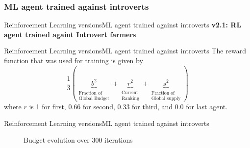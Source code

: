 \documentclass[10pt, aspectratio=169]{beamer}
\def\ab{Reinforcement Learning versions}
\def\abc{ML agent trained against introverts}
\begin{document}
\subsubsection{\abc}

\begin{frame}{\ab}{\abc}
  \centering
  \textbf{v2.1: RL agent trained againt Introvert farmers}
\end{frame}

\begin{frame}{\ab}{\abc}
  The reward function that was used for training is given by
\begin{equation}
    \frac{1}{3}(\underbrace{b^2}_{\substack{\text{Fraction of}\\\text{Global Budget}}} + \underbrace{r^2}_{\substack{\text{Current}\\\text{Ranking}}} + \underbrace{s^2}_{\substack{\text{Fraction of}\\\text{Global supply}}})
\end{equation}
where $r$ is 1 for first, $0.66$ for second, $0.33$ for third, and
$0.0$ for last agent.
\end{frame}


\begin{frame}{\ab}{\abc}
\begin{figure}[H]
    \centering
    \caption{Budget evolution over 300 iterations}
    \label{fig:budget MLvsIntros}
\end{figure}
\end{frame}
\end{document}
